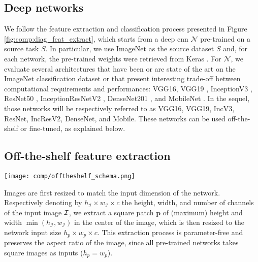 \subsection{Deep networks}
We follow the feature extraction and classification process presented in Figure \ref{fig:comp:diag_feat_extract}, which starts from a deep \acrshort{cnn} $\mathcal{N}$ pre-trained on a source task $S$. In particular, we use ImageNet as the source dataset $S$ and, for each network, the pre-trained weights were retrieved from Keras \parencite{chollet2015keras}. For $\mathcal{N}$, we evaluate several architectures that have been or are state of the art on the ImageNet classification dataset \parencite{deng2009imagenet} or that present interesting trade-off between computational requirements and performances: VGG16, VGG19 \parencite{simonyan2014very}, InceptionV3 \parencite{szegedy2016rethinking}, ResNet50 \parencite{he2016deep}, InceptionResNetV2 \parencite{szegedy2017inception}, DenseNet201 \parencite{huang2017densely}, and MobileNet \parencite{howard2017mobilenets}. In the sequel, those networks will be respectively referred to as VGG16, VGG19, IncV3, ResNet, IncResV2, DenseNet, and Mobile. These networks can be used off-the-shelf or fine-tuned, as explained below.

\subsection{Off-the-shelf feature extraction}

 \begin{figure*}
   \center
   \texttt{[image: comp/offtheshelf\_schema.png]}
     \caption{Feature extraction from pre-trained convolutional neural networks}
     \label{fig:comp:diag_feat_extract}
 \end{figure*}


Images are first resized to match the input dimension of the network. Respectively denoting by $h_{\mathcal{I}} \times w_{\mathcal{I}} \times c$ the height, width, and number of channels of the input image ${\cal I}$, we extract a square patch $\mathbf{p}$ of (maximum) height and width $\min(h_{\mathcal{I}}, w_{\mathcal{I}})$ in the center of the image, which is then resized to the network input size $h_p\times w_p\times c$. This extraction process is parameter-free and preserves the aspect ratio of the image, since all pre-trained networks takes square images as inputs (\ie $h_p=w_p$).


